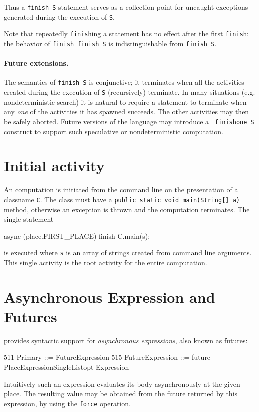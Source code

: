 Thus a {\tt finish S} statement serves as a collection point for
uncaught exceptions generated during the execution of {\tt S}.

Note that repeatedly {\tt finish}ing a statement has no effect after
the first {\tt finish}: the behavior of {\tt finish finish S} is
indistinguishable from {\tt finish S}.

\paragraph{Future extensions.} 

The semantics of {\tt finish S} is conjunctive; it terminates when all
the activities created during the execution of {\tt S} (recursively)
terminate. In many situations (e.g.{} nondeterministic search) it is
natural to require a statement to terminate when any {\em one} of the
activities it has spawned succeeds. The other activities may then be
safely aborted. Future versions of the language may introduce a {\tt
finishone S} construct to support such speculative or nondeterministic
computation.


\section{Initial activity}\label{initial-computation}

An \Xten{} computation is initiated from the command line on the
presentation of a classname {\tt C}. The class must have a {\tt public
static void main(String[] a)} method, otherwise an exception is thrown
and the computation terminates.  The single statement
\begin{x10}
async (place.FIRST\_PLACE) { finish C.main(s); }
\end{x10} 
\noindent is executed where {\tt s} is an array of strings created
from command line arguments. This single activity is the root activity
for the entire computation.


\section{Asynchronous Expression and Futures}\label{XtenFutures}

\Xten{} provides syntactic support for {\em asynchronous expressions}, also
known as futures:
\begin{x10}
511   Primary ::= FutureExpression
515   FutureExpression ::= future PlaceExpressionSingleListopt { Expression }
\end{x10} 
Intuitively such an expression evaluates its body asynchronously at
the given place. The resulting value may be obtained from the future
returned by this expression, by using the {\tt force} operation.

